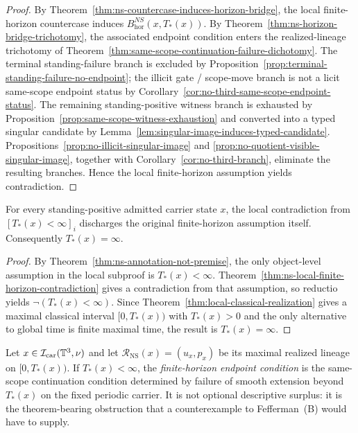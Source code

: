\begin{proof}
By Theorem~\ref{thm:ns-countercase-induces-horizon-bridge}, the local finite-horizon countercase induces $B^{NS}_{\mathrm{hor}}(x,T_*(x))$. By Theorem~\ref{thm:ns-horizon-bridge-trichotomy}, the associated endpoint condition enters the realized-lineage trichotomy of Theorem~\ref{thm:same-scope-continuation-failure-dichotomy}. The terminal standing-failure branch is excluded by Proposition~\ref{prop:terminal-standing-failure-no-endpoint}; the illicit gate / scope-move branch is not a licit same-scope endpoint status by Corollary~\ref{cor:no-third-same-scope-endpoint-status}. The remaining standing-positive witness branch is exhausted by Proposition~\ref{prop:same-scope-witness-exhaustion} and converted into a typed singular candidate by Lemma~\ref{lem:singular-image-induces-typed-candidate}. Propositions~\ref{prop:no-illicit-singular-image} and \ref{prop:no-quotient-visible-singular-image}, together with Corollary~\ref{cor:no-third-branch}, eliminate the resulting branches. Hence the local finite-horizon assumption yields contradiction.
\end{proof}

\begin{manualtheorem}
\label{thm:ns-annotation-discharge-global-smoothness}
For every standing-positive admitted carrier state $x$, the local contradiction from $[T_*(x)<\infty]_i$ discharges the original finite-horizon assumption itself. Consequently $T_*(x)=\infty$.
\end{manualtheorem}

\begin{proof}
By Theorem~\ref{thm:ns-annotation-not-premise}, the only object-level assumption in the local subproof is $T_*(x)<\infty$. Theorem~\ref{thm:ns-local-finite-horizon-contradiction} gives a contradiction from that assumption, so reductio yields $\neg(T_*(x)<\infty)$. Since Theorem~\ref{thm:local-classical-realization} gives a maximal classical interval $[0,T_*(x))$ with $T_*(x)>0$ and the only alternative to global time is finite maximal time, the result is $T_*(x)=\infty$.
\end{proof}


\begin{manualdefinition}
\label{def:finite-horizon-endpoint-condition}
Let $x\in\mathcal I_{\mathrm{car}}(\mathbb{T}^3,\nu)$ and let $\mathcal R_{\mathrm{NS}}(x)=(u_x,p_x)$ be its maximal realized lineage on $[0,T_*(x))$. If $T_*(x)<\infty$, the \emph{finite-horizon endpoint condition} is the same-scope continuation condition determined by failure of smooth extension beyond $T_*(x)$ on the fixed periodic carrier. It is not optional descriptive surplus: it is the theorem-bearing obstruction that a counterexample to Fefferman~(B) would have to supply.
\end{manualdefinition}

